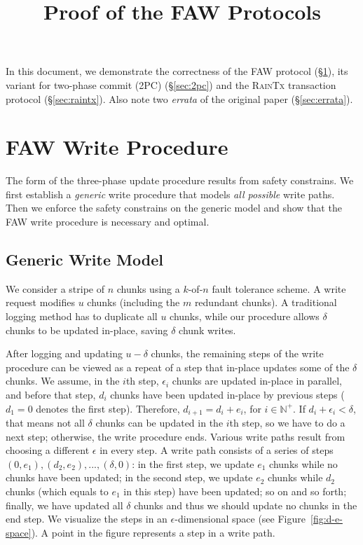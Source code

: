\documentclass[letterpaper,10pt,twocolumn]{article}
\date{}
\def\protocol/{FAW}
\begin{document}
\title{Proof of the \protocol/ Protocols}

\maketitle

In this document, we demonstrate the correctness of the \protocol/ protocol (\S\ref{sec:faw}), its variant for two-phase commit (2PC) (\S\ref{sec:2pc}) and the \textsc{RainTx} transaction protocol (\S\ref{sec:raintx}).
Also note two \emph{errata} of the original paper (\S\ref{sec:errata}).

\section{\protocol/ Write Procedure}
\label{sec:faw}

The form of the three-phase update procedure results from safety constrains.
We first establish a \emph{generic} write procedure that models \emph{all possible} write paths.
Then we enforce the safety constrains on the generic model and show that the \protocol/ write procedure is necessary and optimal. 

\subsection{Generic Write Model}

We consider a stripe of $n$ chunks using a $k$-of-$n$ fault tolerance scheme.
A write request modifies $u$ chunks (including the $m$ redundant chunks).
A traditional logging method has to duplicate all $u$ chunks, while our procedure allows $\delta$ chunks to be updated in-place, saving $\delta$ chunk writes.

After logging and updating $u - \delta$ chunks, the remaining steps of the write procedure can be viewed as a repeat of a step that in-place updates some of the $\delta$ chunks.
We assume, in the $i$th step, $\epsilon_i$ chunks are updated in-place in parallel, and before that step, $d_i$ chunks have been updated in-place by previous steps ($d_1=0$ denotes the first step).
Therefore, $d_{i+1} = d_i + e_i$, for $i \in \mathbb{N}^{+}$. If $d_i + \epsilon_i < \delta$, that means not all $\delta$ chunks can be updated in the $i$th step, so we have to do a next step; otherwise, the write procedure ends.
Various write paths result from choosing a different $\epsilon$ in every step.
A write path consists of a series of steps $(0, e_1), (d_2, e_2), ..., (\delta, 0)$: in the first step, we update $e_1$ chunks while no chunks have been updated; in the second step, we update $e_2$ chunks while $d_2$ chunks (which equals to $e_1$ in this step) have been updated; so on and so forth; finally, we have updated all $\delta$ chunks and thus we should update no chunks in the end step.
We visualize the steps in an $\epsilon$-dimensional space (see Figure~\ref{fig:d-e-space}).
A point in the figure represents a step in a write path.
\end{document}
